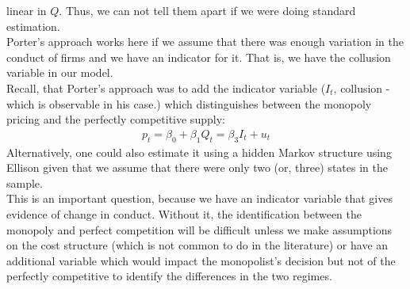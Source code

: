 \documentclass[11pt,letterpaper]{article}
\begin{document}
\begin{enumerate}
  linear in $Q$. Thus, we can not tell them apart if we were doing
  standard estimation.\\
  Porter's approach works here if we assume that there was enough
  variation in the conduct of firms and we have an indicator for
  it. That is, we have the collusion variable in our
  model.\\
  Recall, that Porter's approach was to add the indicator variable
  ($I_t$, collusion - which is observable in his case.) which
  distinguishes between the monopoly pricing and the perfectly
  competitive supply:
  \begin{align*}
    p_t = \beta_0 + \beta_1 Q_t = \beta_3 I_t+ u_t
  \end{align*}
  Alternatively, one could also estimate it using a hidden
  Markov structure using Ellison given that we assume that there were
  only two (or, three) states in the sample.\\
  This is an important question, because we have an indicator variable
  that gives evidence of change in conduct. Without it, the
  identification between the monopoly and perfect competition will be
  difficult unless we make assumptions on the cost structure (which is
  not common to do in the literature) or have an additional variable which
  would impact the monopolist's decision but not of the perfectly
  competitive to identify the differences in the two regimes.
\end{enumerate}
\end{document}
